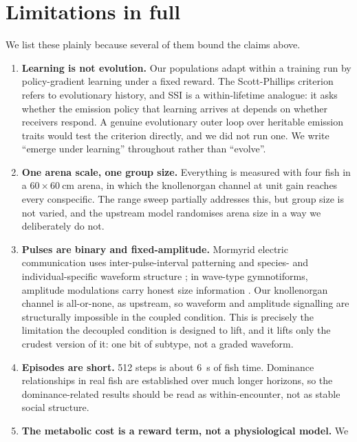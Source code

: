 \section{Limitations in full}
\label{app:limitations}

We list these plainly because several of them bound the claims above.

\begin{enumerate}[leftmargin=1.4em,itemsep=2pt,topsep=2pt]
\item \textbf{Learning is not evolution.} Our populations adapt within a training
      run by policy-gradient learning under a fixed reward. The Scott-Phillips
      criterion refers to evolutionary history, and SSI is a within-lifetime
      analogue: it asks whether the emission policy that learning arrives at
      depends on whether receivers respond. A genuine evolutionary outer loop
      over heritable emission traits would test the criterion directly, and we did
      not run one. We write ``emerge under learning'' throughout rather than
      ``evolve''.
\item \textbf{One arena scale, one group size.} Everything is measured with four
      fish in a $60\times\SI{60}{\centi\metre}$ arena, in which the knollenorgan
      channel at unit gain reaches every conspecific. The range sweep partially
      addresses this, but group size is not varied, and the upstream model
      randomises arena size in a way we deliberately do not.
\item \textbf{Pulses are binary and fixed-amplitude.} Mormyrid electric
      communication uses inter-pulse-interval patterning and species- and
      individual-specific waveform structure
      \citep{baker2013multiplexed,carlson2004stereotyped}; in wave-type
      gymnotiforms, amplitude modulations carry honest size information
      \citep{gavassa2012signal}. Our knollenorgan channel is all-or-none, as
      upstream, so waveform and amplitude signalling are structurally impossible
      in the coupled condition. This is precisely the limitation the decoupled
      condition is designed to lift, and it lifts only the crudest version of it:
      one bit of subtype, not a graded waveform.
\item \textbf{Episodes are short.} 512 steps is about \SI{6}{\second} of fish time.
      Dominance relationships in real fish are established over much longer
      horizons, so the dominance-related results should be read as
      within-encounter, not as stable social structure.
\item \textbf{The metabolic cost is a reward term, not a physiological model.} We

\end{enumerate}
